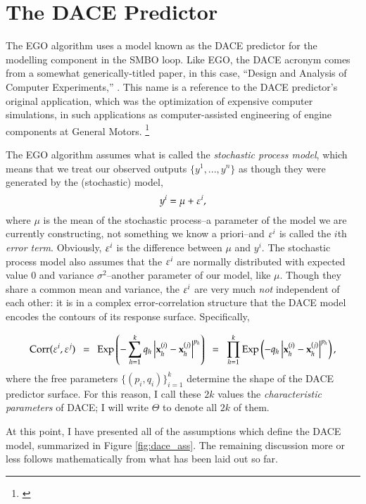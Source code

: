 \section{The DACE Predictor}\label{sec:dace}
The EGO algorithm uses a model known as the DACE predictor for the modelling component in the SMBO loop. Like EGO, the DACE acronym comes from a somewhat generically-titled paper, in this case, ``Design and Analysis of Computer Experiments,'' \cite{sacks_design_1989}. This name is a reference to the DACE predictor's original application, which was the optimization of expensive computer simulations, in such applications as computer-assisted engineering of engine components at General Motors. \footnote{\cite{jones_efficient_1998}}

The EGO algorithm assumes what is called the \emph{stochastic process model}, which means that we treat our observed outputs $\{y^1,...,y^n\}$ as though they were generated by the (stochastic) model,
\begin{equation} \label{eq:stoch_proc}
y^i = \mu + \varepsilon^i,
\end{equation}
where $\mu$ is the mean of the stochastic process--a parameter of the model we are currently constructing, not something we know a priori--and $\varepsilon^i$ is called the $i$th \emph{error term}. Obviously, $\varepsilon^i$ is the difference between $\mu$ and $y^i$. The stochastic process model also assumes that the $\varepsilon^i$ are normally distributed with expected value $0$ and variance $\sigma^2$--another parameter of our model, like $\mu$. Though they share a common mean and variance, the $\varepsilon^i$ are very much \emph{not} independent of each other: it is in a complex error-correlation structure that the DACE model encodes the contours of its response surface. Specifically,

\begin{equation} \label{eq:dace_corr}
\text{Corr}(\eps^i,\eps^j)\ \  = \ \ 
	\text{Exp}
		\left ( 
			-\sum_{h=1}^{k} 
				q_h \left | \X^{(i)}_h - \X^{(j)}_h \right | ^{p_h}
		\right )\ \  = \ \ 
	\prod_{h=1}^{k}
		\text{Exp}
			\left (
				-q_h \left | \X^{(i)}_h - \X^{(j)}_h \right | ^{p_h}
			\right ),
\end{equation}
where the free parameters $\{(p_i,q_i)\}_{i=1}^k$ determine the shape of the DACE predictor surface. For this reason, I call these $2k$ values the \emph{characteristic parameters} of DACE; I will write $\Theta$ to denote all $2k$ of them.

At this point, I have presented all of the assumptions which define the DACE model, summarized in Figure \ref{fig:dace_ass}. The remaining discussion more or less follows mathematically from what has been laid out so far.

